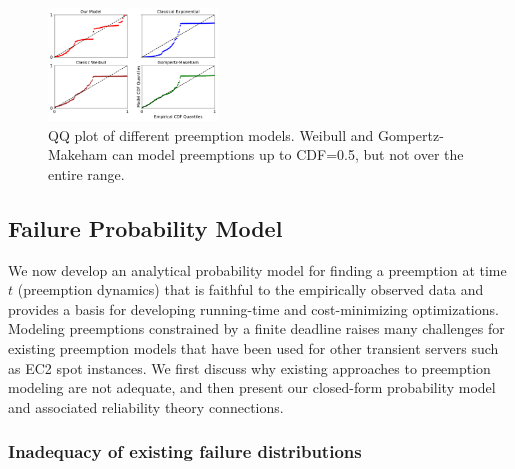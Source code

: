 \begin{figure}
  \includegraphics[width=0.4\textwidth]{../graphs/QQ.pdf}
    \vspace*{-5pt}
    \caption{QQ plot of different preemption models. Weibull and Gompertz-Makeham can model preemptions up to CDF=0.5, but not over the entire range.}
      \vspace*{-7pt}
  \label{fig:QQ}
  \vspace*{-5pt}
\end{figure}



\vspace*{\subsecspace}
\subsection{Failure Probability Model}
\label{subsec:analytical-model}

We now develop an analytical probability model for finding a preemption at time $t$ (preemption dynamics) that is faithful to the empirically observed data and provides a basis for developing running-time and cost-minimizing optimizations. %
Modeling preemptions constrained by a finite deadline raises many challenges for existing preemption models that have been used for other transient servers such as EC2 spot instances. 
We first discuss why existing approaches to preemption modeling are not adequate, and then present our closed-form probability model and associated reliability theory connections. 


\subsubsection{Inadequacy of existing failure distributions}

